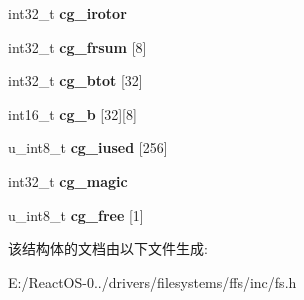 \begin{DoxyCompactItemize}
\mbox{\label{structocg_add6c2c59f8af1e750c15a46f4b934f76}} 
int32\+\_\+t {\bfseries cg\+\_\+irotor}
\item 
\mbox{\label{structocg_a199a53b5e452c9c328316e1f71b5f1e1}} 
int32\+\_\+t {\bfseries cg\+\_\+frsum} \mbox{[}8\mbox{]}
\item 
\mbox{\label{structocg_ad79e1b52043e0c2dee735db1e50a6980}} 
int32\+\_\+t {\bfseries cg\+\_\+btot} \mbox{[}32\mbox{]}
\item 
\mbox{\label{structocg_a42c1b19afae6711ccc992755b0e1105e}} 
int16\+\_\+t {\bfseries cg\+\_\+b} \mbox{[}32\mbox{]}\mbox{[}8\mbox{]}
\item 
\mbox{\label{structocg_a78ad10d5162c8539b732b10ce46a6ee9}} 
u\+\_\+int8\+\_\+t {\bfseries cg\+\_\+iused} \mbox{[}256\mbox{]}
\item 
\mbox{\label{structocg_ab58d52fa78e7ffb1a022e51e205d568a}} 
int32\+\_\+t {\bfseries cg\+\_\+magic}
\item 
\mbox{\label{structocg_a81af56660b5560a964f5f3d36238b2a2}} 
u\+\_\+int8\+\_\+t {\bfseries cg\+\_\+free} \mbox{[}1\mbox{]}
\end{DoxyCompactItemize}


该结构体的文档由以下文件生成\+:\begin{DoxyCompactItemize}
\item 
E\+:/\+React\+O\+S-\/0../drivers/filesystems/ffs/inc/fs.\+h\end{DoxyCompactItemize}
